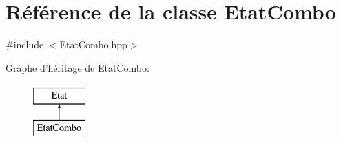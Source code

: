 \hypertarget{class_etat_combo}{\section{Référence de la classe Etat\-Combo}
\label{class_etat_combo}
}


{\ttfamily \#include $<$Etat\-Combo.\-hpp$>$}

Graphe d'héritage de Etat\-Combo\-:\begin{figure}[H]
\begin{center}
\leavevmode
\includegraphics[height=2.000000cm]{class_etat_combo}
\end{center}
\end{figure}
